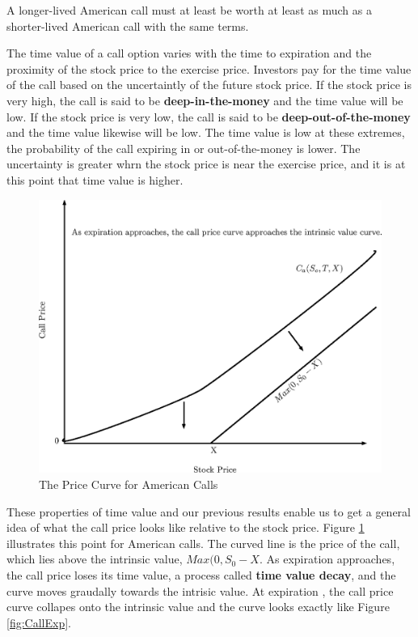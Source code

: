 \documentclass{book}
\theoremstyle{definition}
\theoremstyle{remark}
\begin{document}
        \begin{tcolorbox}[colback=blue!5!white,colframe=blue!75!black, title=Sticky Note]
            A longer-lived American call must at least be worth at least as much as a shorter-lived American call with the same terms. 
        \end{tcolorbox}              
            
            The time value of a call option varies with the time to expiration and the proximity  of the stock price to the exercise price. Investors pay for the time value of the call based on the uncertaintly of the future stock price. If the stock price is very high, the call is said to be \textbf{deep-in-the-money} and the time value will be low. If the stock price is very low, the call is said to be \textbf{deep-out-of-the-money} and the time value likewise will be low. The time value is low at these extremes, the probability of the call expiring in or out-of-the-money is lower. The uncertainty is greater whrn the stock price is near the exercise price, and it is at this point that time value is higher. 
            
                \begin{figure}[h]
                    \centering
                        \includegraphics[scale=0.65]{images/fig:ACallExp.eps}
                    \caption{The Price Curve for American Calls}
                    \label{fig:ACallExp}                
                \end{figure}
            
            These properties of time value and our previous results enable us to get a general idea of what the call price looks like relative to the stock price. Figure \ref{fig:ACallExp} illustrates this point for American calls. The curved line is the price of the call, which lies above the intrinsic value, $Max(0, S_0 -X$. As expiration approaches, the call price loses its time value, a process called \textbf{time value decay}, and the curve moves graudally towards the intrisic value. At expiration , the call price curve collapes onto the intrinsic value and the curve looks exactly like Figure \ref{fig:CallExp}. 
\end{document}
